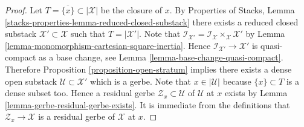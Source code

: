 \documentclass[10pt,a4paper]{amsart}
\theoremstyle{plain}
\theoremstyle{definition}
\theoremstyle{remark}
\numberwithin{equation}{subsection}
\begin{document}
\begin{proof}
Let $T = \overline{\{x\}} \subset |\mathcal{X}|$ be the closure of $x$.
By
Properties of Stacks, Lemma
\ref{stacks-properties-lemma-reduced-closed-substack}
there exists a reduced closed substack $\mathcal{X}' \subset \mathcal{X}$
such that $T = |\mathcal{X}'|$. Note that
$\mathcal{I}_{\mathcal{X}'} =
\mathcal{I}_\mathcal{X} \times_\mathcal{X} \mathcal{X}'$ by
Lemma \ref{lemma-monomorphism-cartesian-square-inertia}.
Hence $\mathcal{I}_{\mathcal{X}'} \to \mathcal{X}'$ is
quasi-compact as a base change, see
Lemma \ref{lemma-base-change-quasi-compact}.
Therefore
Proposition \ref{proposition-open-stratum}
implies there exists a dense open substack
$\mathcal{U} \subset \mathcal{X}'$
which is a gerbe. Note that $x \in |\mathcal{U}|$ because $\{x\} \subset T$
is a dense subset too. Hence a residual gerbe
$\mathcal{Z}_x \subset \mathcal{U}$ of $\mathcal{U}$ at $x$ exists by
Lemma \ref{lemma-gerbe-residual-gerbe-exists}.
It is immediate from the definitions that $\mathcal{Z}_x \to \mathcal{X}$
is a residual gerbe of $\mathcal{X}$ at $x$.
\end{proof}
\end{document}
